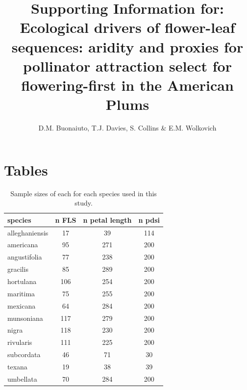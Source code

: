 \documentclass{article}[11pt]
\title{Supporting Information for: Ecological drivers of flower-leaf sequences: aridity and proxies for pollinator attraction select for flowering-first in the American Plums}
\author{D.M. Buonaiuto, T.J. Davies, S. Collins \& E.M. Wolkovich}
\date{}
\begin{document}

\maketitle

\section*{Tables}
\begin{table}[ht]
\centering
\begin{tabular}{|lccc|}
  \hline
  species & n FLS & n petal length & n pdsi \\ 
  \hline
 alleghaniensis &  17 &  39 & 114 \\ 
americana &  95 & 271 & 200 \\ 
angustifolia &  77 & 238 & 200 \\ 
 gracilis &  85 & 289 & 200 \\ 
 hortulana & 106 & 254 & 200 \\ 
  maritima &  75 & 255 & 200 \\ 
  mexicana &  64 & 284 & 200 \\ 
  munsoniana & 117 & 279 & 200 \\ 
 nigra & 118 & 230 & 200 \\ 
   rivularis & 111 & 225 & 200 \\ 
   subcordata &  46 &  71 &  30 \\ 
   texana &  19 &  38 &  39 \\ 
  umbellata &  70 & 284 & 200 \\ 
   \hline
\end{tabular}
\caption{Sample sizes of each for each species used in this study.}
\label{tab:samps}
\end{table}
\end{document}
